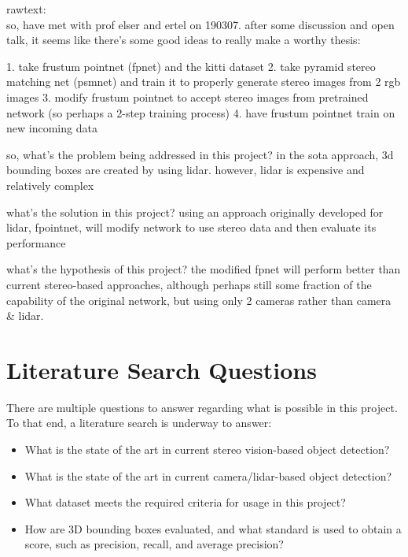 rawtext: \\
so, have met with prof elser and ertel on 190307. after some discussion and open talk, it seems like there's some good ideas to really make a worthy thesis: 

1. take frustum pointnet (fpnet) and the kitti dataset
2. take pyramid stereo matching net (psmnet) and train it to properly generate stereo images from 2 rgb images
3. modify frustum pointnet to accept stereo images from pretrained network (so perhaps a 2-step training process)
4. have frustum pointnet train on new incoming data

so, what's the problem being addressed in this project? 
in the sota approach, 3d bounding boxes are created by using lidar. however, lidar is expensive and relatively complex

what's the solution in this project? 
using an approach originally developed for lidar, fpointnet, will modify network to use stereo data and then evaluate its performance

what's the hypothesis of this project?
the modified fpnet will perform better than current stereo-based approaches, although perhaps still some fraction of the capability of the original network, but using only 2 cameras rather than camera & lidar.




\section{Literature Search Questions}
There are multiple questions to answer regarding what is possible in this project. To that end, a literature search is underway to answer:

\begin{itemize} \itemsep=-0.5em
\item What is the state of the art in current stereo vision-based object detection? %
\item What is the state of the art in current camera/lidar-based object detection?  %
\item What dataset meets the required criteria for usage in this project?			%
\item How are 3D bounding boxes evaluated, and what standard is used to obtain a score, such as precision, recall, and average precision?
\end{itemize}

